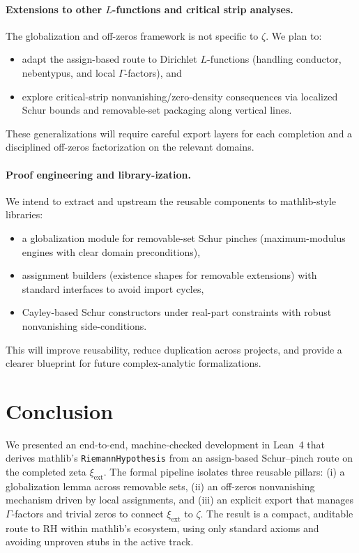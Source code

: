 \documentclass[11pt]{article}
\theoremstyle{plain}
\theoremstyle{definition}
\begin{document}
\paragraph{Extensions to other \(L\)-functions and critical strip analyses.}
The globalization and off-zeros framework is not specific to \(\zeta\). We plan to:
\begin{itemize}
  \item adapt the assign-based route to Dirichlet \(L\)-functions (handling conductor, nebentypus, and local \(\Gamma\)-factors), and
  \item explore critical-strip nonvanishing/zero-density consequences via localized Schur bounds and removable-set packaging along vertical lines.
\end{itemize}
These generalizations will require careful export layers for each completion and a disciplined off-zeros factorization on the relevant domains.

\paragraph{Proof engineering and library-ization.}
We intend to extract and upstream the reusable components to mathlib-style libraries:
\begin{itemize}
  \item a globalization module for removable-set Schur pinches (maximum-modulus engines with clear domain preconditions),
  \item assignment builders (existence shapes for removable extensions) with standard interfaces to avoid import cycles,
  \item Cayley-based Schur constructors under real-part constraints with robust nonvanishing side-conditions.
\end{itemize}
This will improve reusability, reduce duplication across projects, and provide a clearer blueprint for future complex-analytic formalizations.


\section{Conclusion}
\label{sec:conclusion}

We presented an end-to-end, machine-checked development in Lean~4 that derives mathlib's \texttt{RiemannHypothesis} from an assign-based Schur--pinch route on the completed zeta \(\xi_{\mathrm{ext}}\). The formal pipeline isolates three reusable pillars: (i) a globalization lemma across removable sets, (ii) an off-zeros nonvanishing mechanism driven by local assignments, and (iii) an explicit export that manages \(\Gamma\)-factors and trivial zeros to connect \(\xi_{\mathrm{ext}}\) to \(\zeta\).
The result is a compact, auditable route to RH within mathlib's ecosystem, using only standard axioms and avoiding unproven stubs in the active track.
\end{document}
